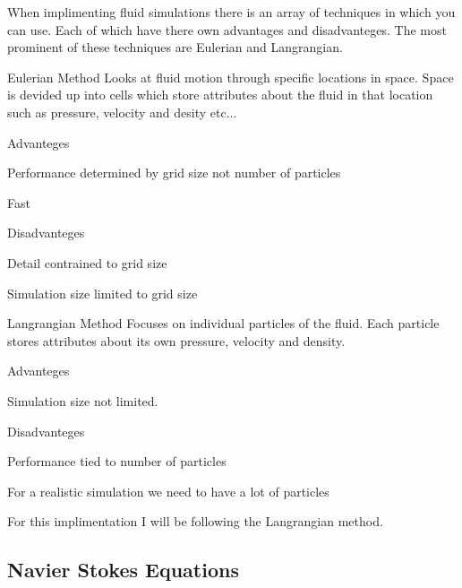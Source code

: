 When implimenting fluid simulations there is an array of techniques in which you can use. Each of which have there own advantages and disadvanteges. The most prominent of these techniques are Eulerian and Langrangian.
\begin{DoxyItemize}
\item Eulerian Method Looks at fluid motion through specific locations in space. Space is devided up into cells which store attributes about the fluid in that location such as pressure, velocity and desity etc...
\begin{DoxyItemize}
\item Advanteges
\begin{DoxyItemize}
\item Performance determined by grid size not number of particles
\item Fast
\end{DoxyItemize}
\item Disadvanteges
\begin{DoxyItemize}
\item Detail contrained to grid size
\item Simulation size limited to grid size
\end{DoxyItemize}
\end{DoxyItemize}
\item Langrangian Method Focuses on individual particles of the fluid. Each particle stores attributes about its own pressure, velocity and density.
\begin{DoxyItemize}
\item Advanteges
\begin{DoxyItemize}
\item Simulation size not limited.
\end{DoxyItemize}
\item Disadvanteges
\begin{DoxyItemize}
\item Performance tied to number of particles
\item For a realistic simulation we need to have a lot of particles
\end{DoxyItemize}
\end{DoxyItemize}
\end{DoxyItemize}

For this implimentation I will be following the Langrangian method.

\subsection*{Navier Stokes Equations }

